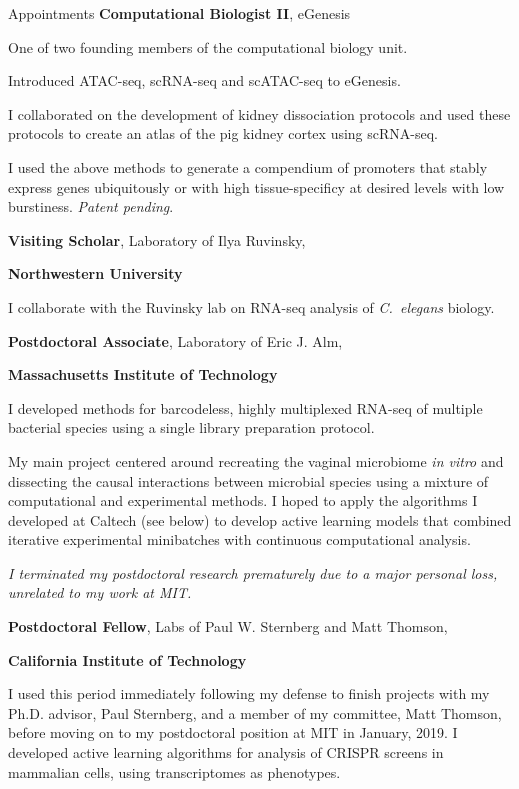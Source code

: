 \begin{rubric}{Appointments}
\entry*[11/2019 -]
	\textbf{Computational Biologist II}, eGenesis\par
	One of two founding members of the computational biology unit.\par
	Introduced ATAC-seq, scRNA-seq and scATAC-seq to eGenesis.\par
	I collaborated on the development of kidney dissociation protocols and used
	these protocols to create an atlas of the pig kidney cortex using scRNA-seq.\par
	I used the above methods to generate a compendium of promoters that stably
	express genes ubiquitously or with high tissue-specificy at desired levels with
	low burstiness. \textit{Patent pending}.

\entry*[7/2020 -]
	\textbf{Visiting Scholar}, Laboratory of Ilya Ruvinsky,\par
	\textbf{Northwestern University}\par
	I collaborate with the Ruvinsky lab on RNA-seq analysis of \textit{C.~elegans}
	biology.

\entry*[01/2019--11/2019]
		\textbf{Postdoctoral Associate}, Laboratory of Eric J. Alm,\par
		\textbf{Massachusetts Institute of Technology}\par
		I developed methods for barcodeless, highly multiplexed RNA-seq of multiple
		bacterial species using a single library preparation protocol. \par
		My main project centered around recreating the vaginal microbiome \textit{in
		vitro} and dissecting the causal interactions between microbial species
		using a mixture of computational and experimental methods. I hoped to apply
		the algorithms I developed at Caltech (see below) to develop active learning
		models that combined iterative experimental minibatches with continuous
		computational analysis.\par
		\textit{I terminated my postdoctoral research prematurely due to a major
		personal loss, unrelated to my work at MIT.}

\entry*[11/2018--01/2019]
		\textbf{Postdoctoral Fellow}, Labs of Paul W. Sternberg and Matt Thomson,\par
		\textbf{California Institute of Technology}\par
		I used this period immediately following my defense to finish
		projects with my Ph.D. advisor, Paul Sternberg, and a member of my
		committee, Matt Thomson, before moving on to my postdoctoral position
		at MIT in January, 2019. I developed active learning algorithms for analysis
		of CRISPR screens in mammalian cells, using transcriptomes as phenotypes.

\end{rubric}
